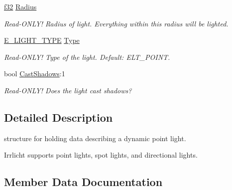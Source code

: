 \begin{DoxyCompactItemize}
\mbox{\label{structirr_1_1video_1_1SLight_a9f3fbdf2869d9beca604ba1cca7499cb}} 
\hyperlink{namespaceirr_a0277be98d67dc26ff93b1a6a1d086b07}{f32} \hyperlink{structirr_1_1video_1_1SLight_a9f3fbdf2869d9beca604ba1cca7499cb}{Radius}
\begin{DoxyCompactList}\small\item\em Read-\/\+O\+N\+L\+Y! Radius of light. Everything within this radius will be lighted. \end{DoxyCompactList}\item 
\mbox{\label{structirr_1_1video_1_1SLight_ac06681bb78d4911775f50d33e21761b4}} 
\hyperlink{namespaceirr_1_1video_aaf0e02f6f83cc35cf9e764bf18400d39}{E\+\_\+\+L\+I\+G\+H\+T\+\_\+\+T\+Y\+PE} \hyperlink{structirr_1_1video_1_1SLight_ac06681bb78d4911775f50d33e21761b4}{Type}
\begin{DoxyCompactList}\small\item\em Read-\/\+O\+N\+L\+Y! Type of the light. Default\+: E\+L\+T\+\_\+\+P\+O\+I\+NT. \end{DoxyCompactList}\item 
\mbox{\label{structirr_1_1video_1_1SLight_afbc66ada0baaf9f642d165fb8b11118b}} 
bool \hyperlink{structirr_1_1video_1_1SLight_afbc66ada0baaf9f642d165fb8b11118b}{Cast\+Shadows}\+:1
\begin{DoxyCompactList}\small\item\em Read-\/\+O\+N\+L\+Y! Does the light cast shadows? \end{DoxyCompactList}\end{DoxyCompactItemize}


\subsection{Detailed Description}
structure for holding data describing a dynamic point light. 

Irrlicht supports point lights, spot lights, and directional lights. 

\subsection{Member Data Documentation}
\mbox{\label{structirr_1_1video_1_1SLight_a06c10ab01b8ad1ee554b956bd5baeacc}} 
